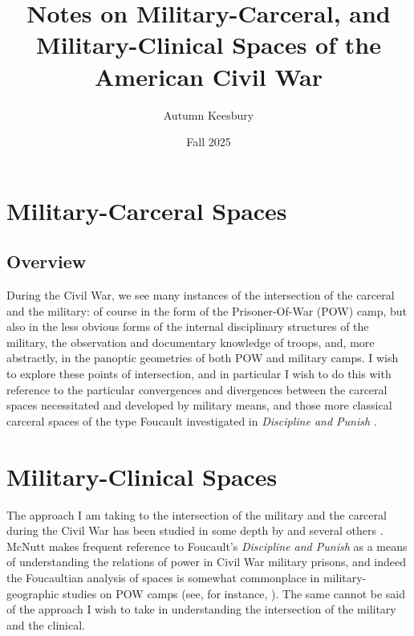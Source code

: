 \documentclass{report}
\title{Notes on Military-Carceral, and Military-Clinical Spaces of the American Civil War}
\author{Autumn Keesbury}
\date{Fall 2025}
\begin{document}
  \maketitle
  \thispagestyle{empty}
  \newpage
  \pagestyle{fancy}


  \chapter{Military-Carceral Spaces}\label{chap: 1} %
  
  \section*{Overview}
  During the Civil War, we see many instances of the intersection of the carceral and the military: of course in the form of the Prisoner-Of-War (POW) camp,
  but also in the less obvious forms of the internal disciplinary structures of the military, the observation and documentary knowledge of troops, and, more
  abstractly, in the panoptic geometries of both POW and military camps. I wish to explore these points of intersection, and in particular I wish to do this
  with reference to the particular convergences and divergences between the carceral spaces necessitated and developed by military means, and those more
  classical carceral spaces of the type Foucault investigated in \textit{Discipline and Punish} \autocite{Foucault1995}.


  \chapter{Military-Clinical Spaces}\label{chap: 2} %
  
  The approach I am taking to the intersection of the military and the carceral during the Civil War has been studied in some depth by \citeauthor{McNutt2024}
  and several others \autocites{McNutt2024}{McNutt2021}{McNutt2019}{McNutt2019a}. McNutt makes frequent reference to Foucault's \textit{Discipline and Punish} as a 
  means of understanding the relations of power in Civil War military prisons, and indeed the Foucaultian analysis of spaces is somewhat commonplace in military-geographic studies on POW camps (see, for instance, \citeauthor{Moran2022}). The same cannot be said of the approach I wish to take in understanding the
  intersection of the military and the clinical.
\end{document}
